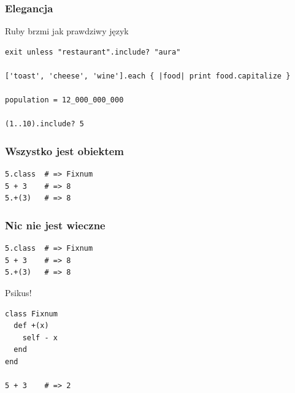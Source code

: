 

\begin{frame}[fragile]
\frametitle{Elegancja}
\begin{block}{Ruby brzmi jak prawdziwy język}
\begin{lstlisting}[style=Ruby,basicstyle=\tiny\ttfamily]
exit unless "restaurant".include? "aura"

['toast', 'cheese', 'wine'].each { |food| print food.capitalize }

population = 12_000_000_000

(1..10).include? 5
\end{lstlisting}
\end{block}
\end{frame}


\begin{frame}[fragile]
\frametitle{Wszystko jest obiektem}
\begin{block}{}
\begin{lstlisting}[style=Ruby]
5.class  # => Fixnum
5 + 3    # => 8
5.+(3)   # => 8
\end{lstlisting}
\end{block}
\end{frame}

\begin{frame}[fragile]
\frametitle{Nic nie jest wieczne}
\begin{block}{}
\begin{lstlisting}[style=Ruby]
5.class  # => Fixnum
5 + 3    # => 8
5.+(3)   # => 8
\end{lstlisting}
\end{block}
\begin{block}{Psikus!}
\begin{lstlisting}[style=Ruby]
class Fixnum
  def +(x)
    self - x
  end
end

5 + 3    # => 2
\end{lstlisting}
\end{block}
\end{frame}

